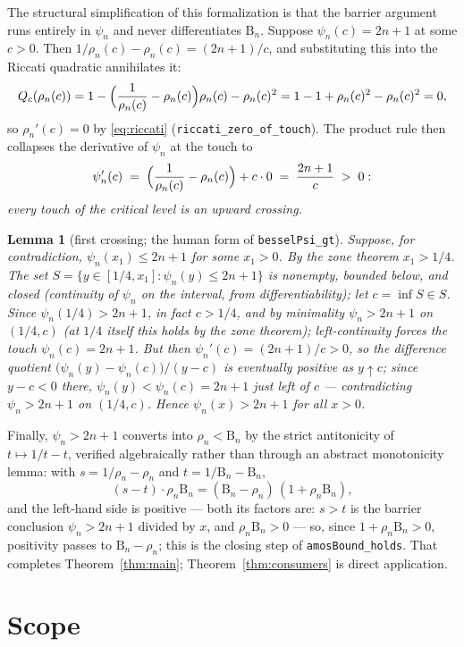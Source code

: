 \documentclass[11pt]{article}
\newtheorem{lemma}[theorem]{Lemma}
\newcommand{\lean}[1]{\texttt{#1}}
\newcommand{\RHS}{\mathrm{B}}
\begin{document}
The structural simplification of this formalization is that the
barrier argument runs entirely in $\psi_n$ and never differentiates
$\RHS_n$.  Suppose $\psi_n(c) = 2n+1$ at some $c > 0$.  Then
$1/\rho_n(c) - \rho_n(c) = (2n+1)/c$, and substituting this into the
Riccati quadratic annihilates it:
\[
Q_c(\rho_n(c))
= 1 - \Bigl(\frac{1}{\rho_n(c)} - \rho_n(c)\Bigr)\rho_n(c)
  - \rho_n(c)^2
= 1 - 1 + \rho_n(c)^2 - \rho_n(c)^2 = 0,
\]
so $\rho_n'(c) = 0$ by \eqref{eq:riccati}
(\lean{riccati\_zero\_of\_touch}).  The product rule then collapses
the derivative of $\psi_n$ at the touch to
\[
\psi_n'(c) \;=\;
\Bigl(\frac{1}{\rho_n(c)} - \rho_n(c)\Bigr)
+ c \cdot 0 \;=\; \frac{2n+1}{c} \;>\; 0 :
\]
\emph{every touch of the critical level is an upward crossing.}

\begin{lemma}[first crossing; the human form of
\lean{besselPsi\_gt}]\label{lem:crossing}
Suppose, for contradiction, $\psi_n(x_1) \le 2n+1$ for some
$x_1 > 0$.  By the zone theorem $x_1 > 1/4$.  The set
$S = \{y \in [1/4, x_1] : \psi_n(y) \le 2n+1\}$ is nonempty,
bounded below, and closed (continuity of $\psi_n$ on the interval,
from differentiability); let $c = \inf S \in S$.  Since
$\psi_n(1/4) > 2n+1$, in fact $c > 1/4$, and by minimality
$\psi_n > 2n+1$ on $(1/4, c)$ (at $1/4$ itself this holds by the
zone theorem); left-continuity forces the touch
$\psi_n(c) = 2n+1$.  But then $\psi_n'(c) = (2n+1)/c > 0$, so the
difference quotient $\bigl(\psi_n(y) - \psi_n(c)\bigr)/(y-c)$ is
eventually positive as $y \uparrow c$; since $y - c < 0$ there,
$\psi_n(y) < \psi_n(c) = 2n+1$ just left of $c$ --- contradicting
$\psi_n > 2n+1$ on $(1/4, c)$.  Hence $\psi_n(x) > 2n+1$ for all
$x > 0$.
\end{lemma}

Finally, $\psi_n > 2n+1$ converts into $\rho_n < \RHS_n$ by the
strict antitonicity of $t \mapsto 1/t - t$, verified algebraically
rather than through an abstract monotonicity lemma: with
$s = 1/\rho_n - \rho_n$ and $t = 1/\RHS_n - \RHS_n$,
\[
(s - t)\cdot \rho_n \RHS_n
= (\RHS_n - \rho_n)\,(1 + \rho_n \RHS_n),
\]
and the left-hand side is positive --- both its factors are:
$s > t$ is the barrier conclusion $\psi_n > 2n+1$ divided by $x$,
and $\rho_n \RHS_n > 0$ --- so, since $1 + \rho_n \RHS_n > 0$,
positivity passes to $\RHS_n - \rho_n$; this is the closing step of
\lean{amosBound\_holds}.  That completes
Theorem~\ref{thm:main}; Theorem~\ref{thm:consumers} is direct
application.

\section{Scope}\label{sec:scope}
\end{document}
